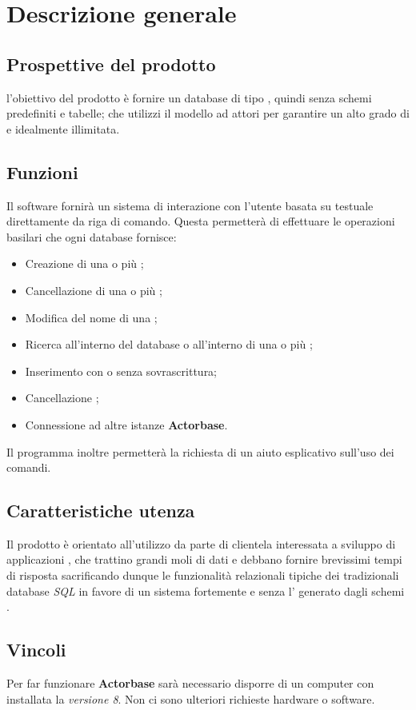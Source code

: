 \documentclass{scalatekids-article}
\begin{document}
\section{Descrizione generale}
\subsection{Prospettive del prodotto}
l'obiettivo del prodotto è fornire un database  di tipo
, quindi senza schemi predefiniti e tabelle; che utilizzi il
modello ad attori per garantire un alto grado di  e
 idealmente illimitata.
\subsection{Funzioni}
Il software fornirà un sistema di interazione con l'utente basata su 
testuale direttamente da riga di comando. Questa permetterà di effettuare le operazioni
basilari che ogni database fornisce:
\begin{itemize}
\item Creazione di una o più ;
\item Cancellazione di una o più ;
\item Modifica del nome di una ;
\item Ricerca all'interno del database o all'interno di una o più ;
\item Inserimento  con o senza sovrascrittura;
\item Cancellazione ;
\item Connessione ad altre istanze \textbf{Actorbase}.
\end{itemize}
Il programma inoltre permetterà la richiesta di un aiuto esplicativo sull'uso
dei comandi.
\subsection{Caratteristiche utenza}
Il prodotto è orientato all'utilizzo da parte di clientela interessata a
sviluppo di applicazioni , che trattino grandi moli di dati e
debbano fornire brevissimi tempi di risposta sacrificando dunque le
funzionalità relazionali tipiche dei tradizionali database \textit{SQL} in
favore di un sistema fortemente  e senza l' generato
dagli schemi .
\subsection{Vincoli}
Per far funzionare \textbf{Actorbase} sarà necessario disporre di un computer con
installata la \textit{ versione 8}. Non ci sono ulteriori richieste hardware o software.
\end{document}
